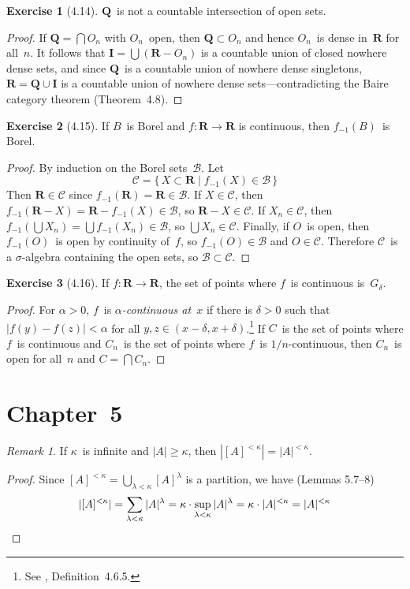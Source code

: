 \documentclass[letterpaper,12pt]{article}
\newcommand{\Q}{\boldsymbol{Q}}
\newcommand{\I}{\boldsymbol{I}}
\newcommand{\R}{\boldsymbol{R}}
\newcommand{\B}{\mathcal{B}}
\newcommand{\CC}{\mathcal{C}}
\newcommand{\Gd}{G_{\delta}}
\newcommand{\union}{\cup}
\newcommand{\bigunion}{\bigcup}
\newcommand{\bigsect}{\bigcap}
\newcommand{\mult}{\cdot}
\newcommand{\preimage}[1]{#1_{-1}}
\newcommand{\card}[1]{|#1|}
\newcommand{\abs}[1]{|#1|}
\theoremstyle{definition}
\newtheorem*{exer}{Exercise}
\theoremstyle{remark}
\newtheorem*{rmk}{Remark}
\begin{document}
\begin{exer}[4.14]
\(\Q\)~is not a countable intersection of open sets.
\end{exer}
\begin{proof}
If \(\Q=\bigsect O_n\) with \(O_n\)~open, then \(\Q\subset O_n\) and hence \(O_n\)~is dense in~\(\R\) for all~\(n\). It follows that \(\I=\bigunion(\R-O_n)\) is a countable union of closed nowhere dense sets, and since \(\Q\)~is a countable union of nowhere dense singletons, \(\R=\Q\union\I\) is a countable union of nowhere dense sets---contradicting the Baire category theorem (Theorem~4.8).
\end{proof}

\begin{exer}[4.15]
If \(B\)~is Borel and \(f:\R\to\R\) is continuous, then \(\preimage{f}(B)\)~is Borel.
\end{exer}
\begin{proof}
By induction on the Borel sets~\(\B\). Let
\[\CC=\{\,X\subset\R\mid\preimage{f}(X)\in\B\,\}\]
Then \(\R\in\CC\) since \(\preimage{f}(\R)=\R\in\B\). If \(X\in\CC\), then \(\preimage{f}(\R-X)=\R-\preimage{f}(X)\in\B\), so \(\R-X\in\CC\). If \(X_n\in\CC\), then \(\preimage{f}(\bigunion X_n)=\bigunion\preimage{f}(X_n)\in\B\), so \(\bigunion X_n\in\CC\). Finally, if \(O\)~is open, then \(\preimage{f}(O)\)~is open by continuity of~\(f\), so \(\preimage{f}(O)\in\B\) and \(O\in\CC\). Therefore \(\CC\)~is a \(\sigma\)-algebra containing the open sets, so \(\B\subset\CC\).
\end{proof}

\begin{exer}[4.16]
If \(f:\R\to\R\), the set of points where \(f\)~is continuous is~\(\Gd\).
\end{exer}
\begin{proof}
For \(\alpha>0\), \(f\)~is \emph{\(\alpha\)-continuous at~\(x\)} if there is \(\delta>0\) such that \(\abs{f(y)-f(z)}<\alpha\) for all \(y,z\in(x-\delta,x+\delta)\).\footnote{See \cite{abbott}, Definition~4.6.5.} If \(C\)~is the set of points where \(f\)~is continuous and \(C_n\)~is the set of points where \(f\)~is \(1/n\)-continuous, then \(C_n\)~is open for all~\(n\) and \(C=\bigsect C_n\).
\end{proof}

\section*{Chapter~5}
\begin{rmk}
If \(\kappa\)~is infinite and \(\card{A}\ge\kappa\), then \(\card{[A]^{<\kappa}}=\card{A}^{<\kappa}\).
\end{rmk}
\begin{proof}
Since \([A]^{<\kappa}=\bigunion_{\lambda<\kappa}[A]^{\lambda}\) is a partition, we have (Lemmas 5.7--8)
\[\card{[A]^{<\kappa}}=\sum_{\lambda<\kappa}\card{A}^{\lambda}=\kappa\mult\sup_{\lambda<\kappa}\card{A}^{\lambda}=\kappa\mult\card{A}^{<\kappa}=\card{A}^{<\kappa}\qedhere\]
\end{proof}
\end{document}
